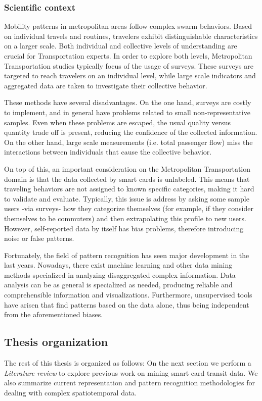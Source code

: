 \documentclass{article}
\begin{document}
\subsubsection{Scientific context}
Mobility patterns in metropolitan areas follow complex swarm behaviors. Based on individual travels and routines, travelers exhibit distinguishable characteristics on a larger scale. Both individual and collective levels of understanding are crucial for Transportation experts. In order to explore both levels, Metropolitan Transportation studies typically focus of the usage of surveys. These surveys are targeted to reach travelers on an individual level, while large scale indicators and aggregated data are taken to investigate their collective behavior. 

These methods have several disadvantages. On the one hand, surveys are costly to implement, and in general have problems related to small non-representative samples. Even when these problems are escaped, the usual quality versus quantity trade off is present, reducing the confidence of the collected information. On the other hand, large scale measurements (i.e. total passenger flow) miss the interactions between individuals that cause the collective behavior.

On top of this, an important consideration on the Metropolitan Transportation domain is that the data collected by smart cards is unlabeled. This means that traveling behaviors are not assigned to known specific categories, making it hard to validate and evaluate. Typically, this issue is address by asking some sample users -via surveys- how they categorize themselves (for example, if they consider themselves to be commuters) and then extrapolating this profile to new users. However, self-reported data by itself has bias problems, therefore introducing noise or false patterns. 

Fortunately, the field of pattern recognition has seen major development in the last years. Nowadays, there exist machine learning and other data mining methods specialized in analyzing disaggregated complex information. Data analysis can be as general is specialized as needed, producing reliable and comprehensible information and visualizations. Furthermore, unsupervised tools have arisen that find patterns based on the data alone, thus being independent from the aforementioned biases.


\subsection{Thesis organization}
The rest of this thesis is organized as follows: On the next section we perform a \textit{Literature review} to explore previous work on mining smart card transit data. We also summarize current representation and pattern recognition methodologies for dealing with complex spatiotemporal data.  
\end{document}
